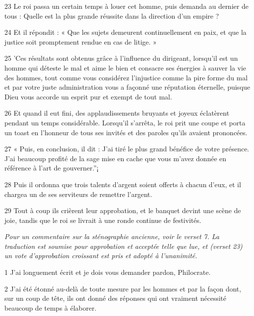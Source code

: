 \par 23 Le roi passa un certain temps à louer cet homme, puis demanda au dernier de tous : Quelle est la plus grande réussite dans la direction d'un empire ?

\par 24 Et il répondit : « Que les sujets demeurent continuellement en paix, et que la justice soit promptement rendue en cas de litige. »

\par 25 'Ces résultats sont obtenus grâce à l'influence du dirigeant, lorsqu'il est un homme qui déteste le mal et aime le bien et consacre ses énergies à sauver la vie des hommes, tout comme vous considérez l'injustice comme la pire forme du mal et par votre juste administration vous a façonné une réputation éternelle, puisque Dieu vous accorde un esprit pur et exempt de tout mal.

\par 26 Et quand il eut fini, des applaudissements bruyants et joyeux éclatèrent pendant un temps considérable. Lorsqu'il s'arrêta, le roi prit une coupe et porta un toast en l'honneur de tous ses invités et des paroles qu'ils avaient prononcées.

\par 27 « Puis, en conclusion, il dit : J'ai tiré le plus grand bénéfice de votre présence. J'ai beaucoup profité de la sage mise en cache que vous m'avez donnée en référence à l'art de gouverner.''¡

\par 28 Puis il ordonna que trois talents d'argent soient offerts à chacun d'eux, et il chargea un de ses serviteurs de remettre l'argent.

\par 29 Tout à coup ils crièrent leur approbation, et le banquet devint une scène de joie, tandis que le roi se livrait à une ronde continue de festivités.


\par \textit{Pour un commentaire sur la sténographie ancienne, voir le verset 7. La traduction est soumise pour approbation et acceptée telle que lue, et (verset 23) un vote d'approbation croissant est pris et adopté à l'unanimité.}

\par 1 J'ai longuement écrit et je dois vous demander pardon, Philocrate.

\par 2 J'ai été étonné au-delà de toute mesure par les hommes et par la façon dont, sur un coup de tête, ils ont donné des réponses qui ont vraiment nécessité beaucoup de temps à élaborer.

